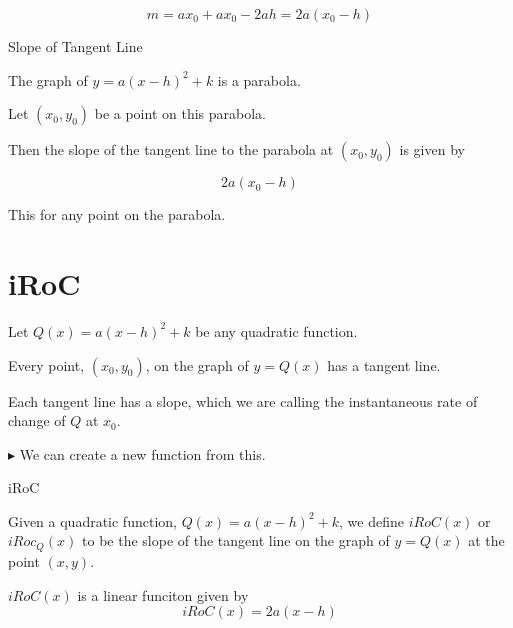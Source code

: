 \documentclass{ximera}
\begin{document}
\[
m = a x_0 + a x_0 - 2 a h = 2 a (x_0 - h)
\] 



\begin{conclusion} Slope of Tangent Line


The graph of $y = a (x - h)^2 + k$ is a parabola.

Let $(x_0, y_0)$ be a point on this parabola.

Then the slope of the tangent line to the parabola at $(x_0, y_0)$ is given by 



\[ 2 a (x_0 - h) \]


\end{conclusion}
This for any point on the parabola.








\section{iRoC}

Let $Q(x) = a (x - h)^2 + k$ be any quadratic function.

Every point, $(x_0, y_0)$, on the graph of $y = Q(x)$ has a tangent line.

Each tangent line has a slope, which we are calling the instantaneous rate of change of $Q$ at $x_0$.


$\blacktriangleright$ We can create a new function from this.



\begin{definition} iRoC 


Given a quadratic function, $Q(x) = a (x - h)^2 + k$, we define $iRoC(x)$ or $iRoc_Q(x)$ to be the slope of the tangent line on the graph of $y = Q(x)$ at the point $(x, y)$.

$iRoC(x)$ is a linear funciton given by 
\[  iRoC(x) = 2 a (x-h) \]

\end{definition}
\end{document}
